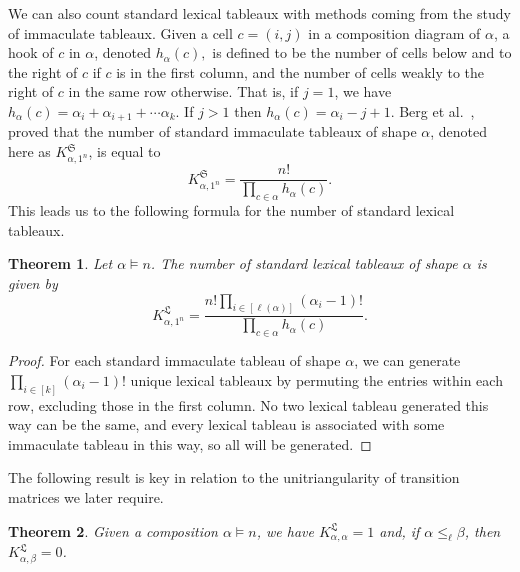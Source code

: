 \documentclass{amsart}
\newtheorem{theorem}{Theorem}[section]
\theoremstyle{definition}
\newcommand{\lx}{\mathfrak{L}}
\begin{document}
 We can also count standard lexical tableaux with methods coming from the study of immaculate tableaux. Given a cell $c = (i,j)$ in a composition 
 diagram of $\alpha$, a hook of $c$ in $\alpha$, denoted $h_{\alpha}(c),$ is defined to be the number of cells below and to the right of $c$ if $c$ is in the first column, and the number of cells weakly to the right of $c$ in the same row otherwise. That is, if $j=1$, we have 
 $h_{\alpha}(c) = \alpha_{i} + \alpha_{i+1} + \cdots \alpha_{k}$. If $j>1$ then $h_{\alpha}(c)=\alpha_i-j+1$. Berg et al.\ 
 \cite{BergBergeronSaliolaSerranoZabrocki2014}, 
 proved that the number of standard immaculate tableaux of shape $\alpha$, denoted here as $K^{\mathfrak{S}}_{\alpha, 1^n}$, is 
 equal to \[ K^{\mathfrak{S}}_{\alpha, 1^n} = \frac{n!}{\prod_{c \in \alpha}h_{\alpha}(c)}.\]
 This leads us to the following formula for the number of standard lexical tableaux.

\begin{theorem} 
 Let $\alpha \vDash n$. The number of standard lexical tableaux of shape $\alpha$ is given by \[ K^{\lx}_{\alpha, 1^n} = \frac{n! \prod_{i \in [\ell(\alpha)]} (\alpha_i-1)!}{\prod_{c \in \alpha} h_{\alpha}(c)}.\]
\end{theorem}

\begin{proof}
For each standard immaculate tableau of shape $\alpha$, we can generate $\prod_{i \in [k]}(\alpha_i - 1)!$ unique lexical tableaux by permuting the entries within each row, excluding those in the first column. No two lexical tableau generated this way can be the same, and every lexical tableau is associated with some immaculate tableau in this way, so all will be generated.
\end{proof}

 The following result is key in relation to the 
 unitriangularity of transition matrices we later require. 

\begin{theorem}\label{theorem:lexical_coeff}
 Given a composition $\alpha \vDash n$, we have $K^{\lx}_{\alpha, \alpha}=1$ and, if $\alpha \leq_{\ell} \beta$, then $K^{\lx}_{\alpha, \beta}=0$.
\end{theorem}
\end{document}
